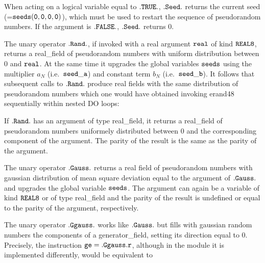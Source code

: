 When acting on a logical variable equal to $\tt .TRUE.$, $\tt .Seed.$
returns the current seed (=$\tt seeds(0,0,0,0)$), which must
be used to restart the sequence of pseudorandom numbers.
If the argument is $\tt .FALSE.$, $\tt .Seed.$  returns $0$.  

The unary operator $\tt .Rand.$, if invoked with a real argument $\tt real$
of kind $\tt REAL8$, returns a real\_field of pseudorandom numbers 
with uniform distribution between 0 and $\tt real$.  At the same time
it upgrades the global variables $\tt seeds$ using the multiplier $a_N$
(i.e.~$\tt seed\_a$) and constant term $b_N$ (i.e.~$\tt seed\_b$).
It follows that subsequent calls to $\tt .Rand.$ produce real fields  
with the same distribution of pseudorandom numbers which one would
have obtained invoking erand48 sequentially within nested DO loops:
\vskip 4mm
{\baselineskip 5mm \tt
{} 
}
  
If $\tt .Rand.$ has an argument of type real\_field, it returns
a real\_field of pseudorandom numbers uniformely distributed between
0 and the corresponding component of the argument.  The parity of
the result is the same as the parity of the argument.

The unary operator $\tt .Gauss.$ returns a real field of
pseudorandom numbers with gaussian distribution
of mean square deviation equal to the argument of
$\tt .Gauss.$ and upgrades the global variable $\tt seeds$. 
The argument can again be a variable of kind $\tt REAL8$
or of type real\_field and the parity of the result is undefined
or equal to the parity of the argument, respectively. 

The unary operator $\tt .Ggauss.$ works like $\tt .Gauss.$ but fills with
gaussian random numbers the components of a generator\_field, 
setting its direction equal to 0.  Precisely, the instruction
$\tt ge=.Ggauss.r $, although in the module it is implemented 
differently, would be equivalent to

\vskip 4mm
{\baselineskip 5mm \tt
{}
}

